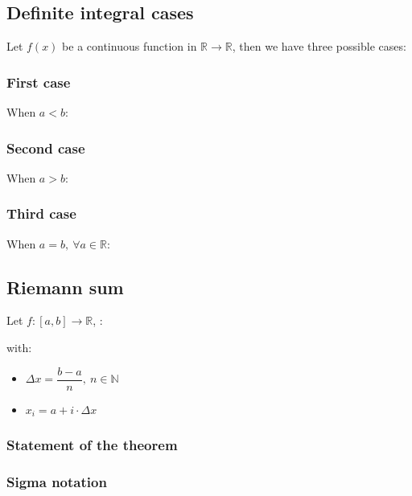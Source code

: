 \documentclass{article}
\begin{document}
\subsection{Definite integral cases}
Let $f(x)$ be a continuous function in $\mathbb{R} \to \mathbb{R}$, then
we have three possible cases:

\subsubsection{First case}
When $a<b$:

\subsubsection{Second case}
When $a>b$:
\figbox{$\integral[a][b][f(x)][x] = -\integral[b][a][f(x)][x]$}

\subsubsection{Third case}
When $a=b,\ \forall a \in \mathbb{R}$:

\subsection{Riemann sum}
Let $f: [a,b] \to \mathbb{R}$, :

with:
\begin{itemize}
    \item $\Delta x = \dfrac{b-a}{n},\ n \in \mathbb{N}$
    \item $x_i = a + i \cdot \Delta x$
\end{itemize}


\subsubsection{Statement of the theorem}

\subsubsection{Sigma notation}
\end{document}
